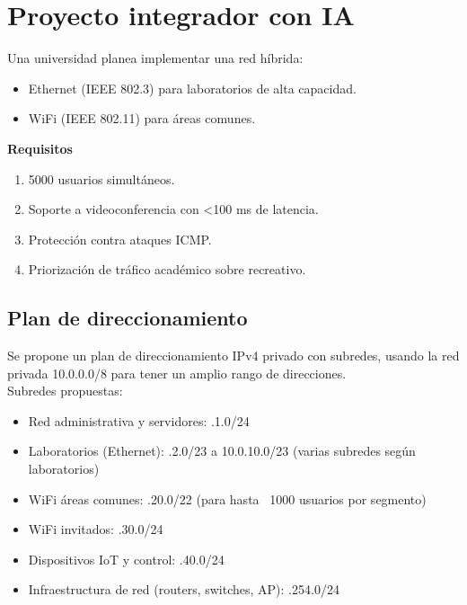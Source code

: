 \section{\textbf{Proyecto integrador con IA}}
Una universidad planea implementar una red híbrida:
    \begin{itemize}
        \item Ethernet (IEEE 802.3) para laboratorios de alta capacidad.
        \item WiFi (IEEE 802.11) para áreas comunes.
    \end{itemize}

    \textbf{Requisitos}
    \begin{enumerate}
        \item 5000 usuarios simultáneos.
        \item Soporte a videoconferencia con <100 ms de latencia.
        \item Protección contra ataques ICMP.
        \item Priorización de tráfico académico sobre recreativo.
    \end{enumerate}

\subsection{\textbf{Plan de direccionamiento}}
Se propone un plan de direccionamiento IPv4 privado con subredes, usando la red privada 10.0.0.0/8 para tener un amplio rango de direcciones.\\

Subredes propuestas:

\begin{itemize}
    \item {Red administrativa y servidores}:
        .1.0/24
    \item {Laboratorios (Ethernet)}:
        .2.0/23 a 10.0.10.0/23 (varias subredes según laboratorios)
    \item {WiFi áreas comunes}:
        .20.0/22 (para hasta ~1000 usuarios por segmento)
    \item {WiFi invitados}:
        .30.0/24
    \item {Dispositivos IoT y control}:
        .40.0/24
    \item {Infraestructura de red (routers, switches, AP)}:
        .254.0/24\\
\end{itemize}


